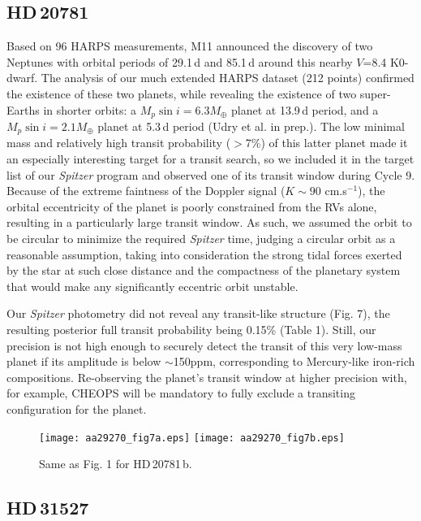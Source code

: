 \documentclass[traditabstract]{aa}
\begin{document}
\subsection{HD\,20781}

Based on 96 HARPS measurements, M11 announced the discovery of two Neptunes with orbital periods of 29.1\,d and 85.1\,d 
around this nearby $V$=8.4 K0-dwarf. The analysis of our much extended HARPS dataset (212 points) confirmed the existence of these two planets, while revealing the existence of two super-Earths in shorter orbits: a $M_p \sin{i} = 6.3 M_\oplus$ planet at 13.9\,d period, and  a $M_p \sin{i} = 2.1 M_\oplus$ planet at 5.3\,d period (Udry et al. in prep.). The low minimal mass and relatively high transit probability 
($>$7\%) of this latter planet made it an especially interesting target for a transit search, so we included it in the target list of our {\it Spitzer} program and observed one of its
transit window during Cycle 9. Because of the extreme faintness of the Doppler signal ($K \sim 90$ cm.s$^{-1}$), the orbital eccentricity of 
the planet is poorly constrained from the RVs alone, resulting in a particularly large transit window. As such, we assumed the orbit to be circular to
minimize the required {\it Spitzer} time, judging a circular orbit as  a reasonable assumption, taking into  consideration the strong tidal forces exerted by the star 
at such close distance and the compactness of the planetary system that would make  any significantly eccentric orbit unstable. 

Our {\it Spitzer} photometry did not reveal any transit-like structure (Fig. 7), the resulting posterior full transit probability being 0.15\% (Table 1). 
Still, our precision is not high enough to securely detect the transit of this very low-mass planet if its amplitude is below $\sim$150ppm, corresponding
to Mercury-like iron-rich compositions. Re-observing the planet's transit window at higher precision with, for example, CHEOPS will be mandatory to fully exclude a transiting configuration for the planet. 

\begin{figure}
\label{fig:7}
\centering                     
\texttt{[image: aa29270\_fig7a.eps]}
\texttt{[image: aa29270\_fig7b.eps]}
\caption{Same as Fig. 1 for HD\,20781\,b.}
\end{figure}

\subsection{HD\,31527}
\end{document}
